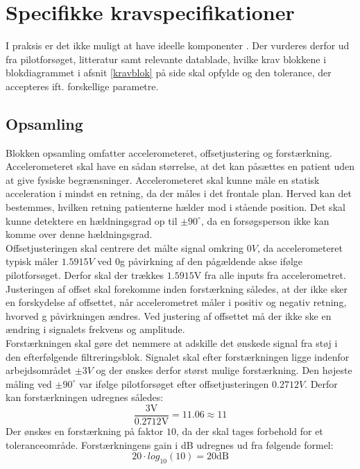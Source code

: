 \section{Specifikke kravspecifikationer}
I praksis er det ikke muligt at have ideelle komponenter \cite{Nilsson2011}. Der vurderes derfor ud fra pilotforsøget, litteratur samt relevante datablade, hvilke krav blokkene i blokdiagrammet i afsnit \ref{kravblok} på side \pageref{kravblok} skal opfylde og den tolerance, der accepteres ift. forskellige parametre.

\subsection{Opsamling}\label{OpsamlingsAfs}
Blokken opsamling omfatter accelerometeret, offsetjustering og forstærkning. Accelerometeret skal have en sådan størrelse, at det kan påsættes en patient uden at give fysiske begrænsninger. Accelerometeret skal kunne måle en statisk acceleration i mindst en retning, da der måles i det frontale plan. Herved kan det bestemmes, hvilken retning patienterne hælder mod i stående position. Det skal kunne detektere en hældningsgrad op til $\pm90^{\circ}$, da en forsøgsperson ikke kan komme over denne hældningsgrad. \\
Offsetjusteringen skal centrere det målte signal omkring $0V$, da accelerometeret typisk måler $1.5915V$ ved $0$g påvirkning af den pågældende akse ifølge pilotforsøget. Derfor skal der trækkes $1.5915$V fra alle inputs fra accelerometret. Justeringen af offset skal forekomme inden forstærkning således, at der ikke sker en forskydelse af offsettet, når accelerometret måler i positiv og negativ retning, hvorved g påvirkningen ændres. Ved justering af offsettet må der ikke ske en ændring i signalets frekvens og amplitude. \\
Forstærkningen skal gøre det nemmere at adskille det ønskede signal fra støj i den efterfølgende filtreringsblok. Signalet skal efter forstærkningen ligge indenfor arbejdsområdet $\pm3V$ og der ønskes derfor størst mulige forstærkning. Den højeste måling ved $\pm90^{\circ}$ var ifølge pilotforsøget efter offsetjusteringen $0.2712V.$ Derfor kan forstærkningen udregnes således:
\begin{equation}
\dfrac{3\text{V}}{0.2712\text{V}} =  11.06 \approx 11
\end{equation}
\noindent Der ønskes en forstærkning på faktor $10$, da der skal tages forbehold for et toleranceområde. Forstærkningens gain i dB udregnes ud fra følgende formel: 
\begin{equation}
20 \cdot log_{10} (10) = 20\text{dB}
\end{equation} 

